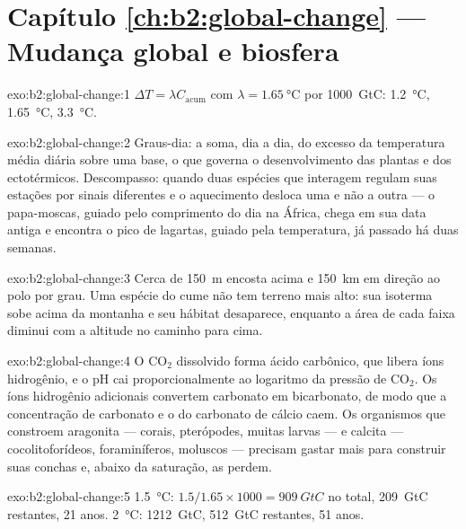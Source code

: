 \section*{Capítulo \ref{ch:b2:global-change} --- Mudança global e biosfera}

\begin{solution}{exo:b2:global-change:1}
$\Delta T = \lambda C_{\text{acum}}$ com $\lambda = \qty{1.65}{\celsius}$
por \qty{1000}{GtC}: \qty{1.2}{\celsius}, \qty{1.65}{\celsius},
\qty{3.3}{\celsius}.
\end{solution}

\begin{solution}{exo:b2:global-change:2}
Graus-dia: a soma, dia a dia, do excesso da temperatura média diária
sobre uma base, o  que governa o desenvolvimento das plantas
e dos ectotérmicos. Descompasso: quando duas espécies que interagem
regulam suas estações por sinais diferentes e o aquecimento desloca uma
e não a outra --- o papa-moscas, guiado pelo comprimento do dia na
África, chega em sua data antiga e encontra o pico de lagartas, guiado
pela temperatura, já passado há duas semanas.
\end{solution}

\begin{solution}{exo:b2:global-change:3}
Cerca de \qty{150}{m} encosta acima e \qty{150}{km} em direção ao polo
por grau. Uma espécie do cume não tem terreno mais alto: sua isoterma
sobe acima da montanha e seu hábitat desaparece, enquanto a área de cada
faixa diminui com a altitude no caminho para cima.
\end{solution}

\begin{solution}{exo:b2:global-change:4}
O \ensuremath{\mathrm{CO_2}} dissolvido forma ácido carbônico, que
libera íons hidrogênio, e o pH cai proporcionalmente ao logaritmo da
pressão de \ensuremath{\mathrm{CO_2}}. Os íons hidrogênio
adicionais convertem carbonato em bicarbonato, de modo que a
concentração de carbonato e o  do carbonato de cálcio
caem. Os organismos que constroem aragonita --- corais, pterópodes,
muitas larvas --- e calcita --- cocolitoforídeos, foraminíferos,
moluscos --- precisam gastar mais para construir suas conchas e, abaixo
da saturação, as perdem.
\end{solution}

\begin{solution}{exo:b2:global-change:5}
\qty{1.5}{\celsius}: $1.5/1.65\times 1000 = \qty{909}{GtC}$ no total,
\qty{209}{GtC} restantes, 21 anos. \qty{2}{\celsius}:
\qty{1212}{GtC}, \qty{512}{GtC} restantes, 51 anos.
\end{solution}

